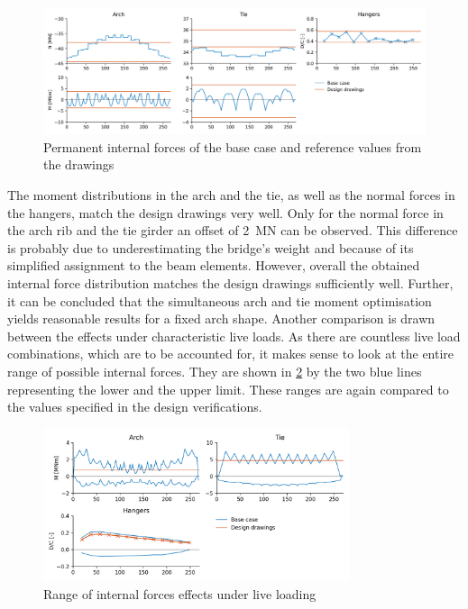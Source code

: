 \begin{figure}[H]
    \centering
    \includegraphics[width=\textwidth]{calculations/Base case/Permanent state.png}
    \caption{Permanent internal forces of the base case and reference values from the drawings}
    \label{fig:base_case_permanent}
\end{figure}

The moment distributions in the arch and the tie, as well as the normal forces in the hangers, match the design drawings very well. Only for the normal force in the arch rib and the tie girder an offset of \SI{2}{MN} can be observed. This difference is probably due to underestimating the bridge's weight and because of its simplified assignment to the beam elements. However, overall the obtained internal force distribution matches the design drawings sufficiently well. Further, it can be concluded that the simultaneous arch and tie moment optimisation yields reasonable results for a fixed arch shape. Another comparison is drawn between the effects under characteristic live loads. As there are countless live load combinations, which are to be accounted for, it makes sense to look at the entire range of possible internal forces. They are shown in \cref{fig:base_case_live} by the two blue lines representing the lower and the upper limit. These ranges are again compared to the values specified in the design verifications.

\begin{figure}[H]
    \centering
    \includegraphics[width=0.8\textwidth]{calculations/Base case/Live load.png}
    \caption{Range of internal forces effects under live loading}
    \label{fig:base_case_live}
\end{figure}

